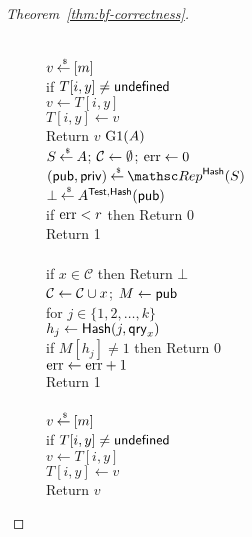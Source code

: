 \begin{proof}[Theorem~\ref{thm:bf-correctness}]
\begin{figure}[tp]
{{\\
$v {\:\stackrel{{\scriptscriptstyle \hspace{0.2em}\$}} {\leftarrow}\:} [m]$\\
if $T[i,y] \neq \mathsf{undefined}$\\
\nudge $v \gets T[i,y]$\\
$T[i,y] \gets v$\\
Return $v$
}
{
\underline{$\text{G1}(A)$}\\
$S {\:\stackrel{{\scriptscriptstyle \hspace{0.2em}\$}} {\leftarrow}\:} A$; ${\cal C} \gets \emptyset$; $\mathrm{err} \gets 0$\\
$(\pubaux,\privaux) \getsr \Rep^{\HashOracle}(S)$\\
$\bot {\:\stackrel{{\scriptscriptstyle \hspace{0.2em}\$}} {\leftarrow}\:} A^{\mathsf{Test},\mathsf{Hash}}({\sf pub})$\\
if $\mathrm{err}  < r$ then Return 0\\
Return 1\\

\\
if $x \in \mathcal{C}$ then Return $\bot$\\
${\cal C} \gets {\cal C} \cup x$; $M \gets{\sf pub}$\\
for $j \in \{1,2,\ldots,k\}$\\
\nudge $h_j \gets \mathsf{Hash}(j, \mathsf{qry}_x)$\\
\nudge if $M[h_j] \neq 1$ then Return 0\\
$\mathrm{err} \gets \mathrm{err} + 1$\\
Return 1\\

\\
$v {\:\stackrel{{\scriptscriptstyle \hspace{0.2em}\$}} {\leftarrow}\:} [m]$\\
if $T[i,y] \neq \mathsf{undefined}$\\
\nudge $v \gets T[i,y]$\\
$T[i,y] \gets v$\\
Return $v$
}
}
\end{figure}
\end{proof}
